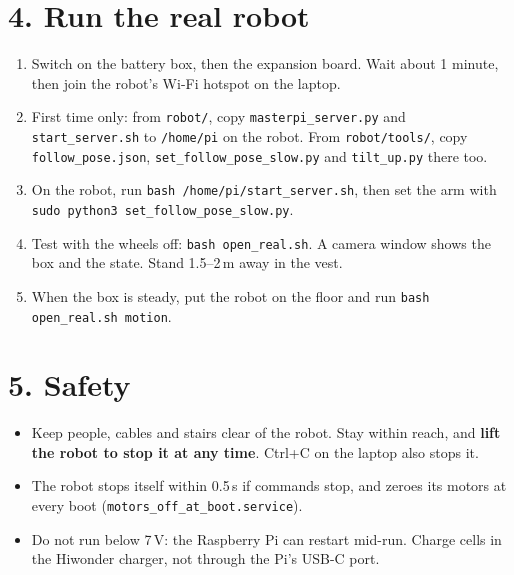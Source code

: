 \documentclass[10pt]{article}
\begin{document}
\section{4. Run the real robot}
\begin{enumerate}
  \item Switch on the battery box, then the expansion board. Wait about 1 minute, then join the robot's Wi-Fi hotspot on the laptop.
  \item First time only: from \texttt{robot/}, copy \texttt{masterpi\_server.py} and \texttt{start\_server.sh} to \texttt{/home/pi} on the robot. From \texttt{robot/tools/}, copy \texttt{follow\_pose.json}, \texttt{set\_follow\_pose\_slow.py} and \texttt{tilt\_up.py} there too.
  \item On the robot, run \texttt{bash /home/pi/start\_server.sh}, then set the arm with \texttt{sudo python3 set\_follow\_pose\_slow.py}.
  \item Test with the wheels off: \texttt{bash open\_real.sh}. A camera window shows the box and the state. Stand 1.5--2\,m away in the vest.
  \item When the box is steady, put the robot on the floor and run \texttt{bash open\_real.sh motion}.
\end{enumerate}

\section{5. Safety}
\begin{itemize}
  \item Keep people, cables and stairs clear of the robot. Stay within reach, and \textbf{lift the robot to stop it at any time}. Ctrl+C on the laptop also stops it.
  \item The robot stops itself within 0.5\,s if commands stop, and zeroes its motors at every boot (\texttt{motors\_off\_at\_boot.service}).
  \item Do not run below 7\,V: the Raspberry Pi can restart mid-run. Charge cells in the Hiwonder charger, not through the Pi's USB-C port.
\end{itemize}
\end{document}
